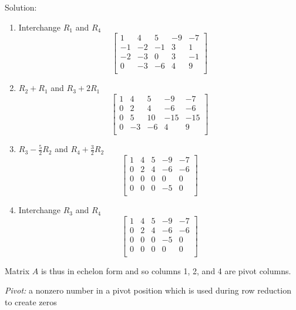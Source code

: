 \documentclass[12pt]{article} %
\begin{document}
Solution:
\begin{enumerate}
\item Interchange $R_1$ and $R_4$
	$$\begin{bmatrix}
		1 & 4 & 5 & -9 & -7\\
		-1 & -2 & -1 & 3 & 1\\
		-2 & -3 & 0 & 3 & -1\\
		0 & -3 & -6 & 4 & 9\\
	\end{bmatrix}$$

\item $R_2 + R_1$ and $R_3 + 2R_1$
	$$\begin{bmatrix}
		1 & 4 & 5 & -9 & -7\\
		0 & 2 & 4 & -6 & -6\\
		0 & 5 & 10 & -15 & -15\\
		0 & -3 & -6 & 4 & 9\\
	\end{bmatrix}$$

\item $R_3 -\frac{5}{2}R_2$ and $R_4 + \frac{3}{2}R_2$
	$$\begin{bmatrix}
		1 & 4 & 5 & -9 & -7\\
		0 & 2 & 4 & -6 & -6\\
		0 & 0 & 0 & 0 & 0\\
		0 & 0 & 0 & -5 & 0\\
	\end{bmatrix}$$

\item Interchange $R_3$ and $R_4$
	$$\begin{bmatrix}
		1 & 4 & 5 & -9 & -7\\
		0 & 2 & 4 & -6 & -6\\
		0 & 0 & 0 & -5 & 0\\
		0 & 0 & 0 & 0 & 0\\
	\end{bmatrix}$$
	
\end{enumerate}
Matrix $A$ is thus in echelon form and so columns 1, 2, and 4 are pivot columns.

\emph{Pivot:} a nonzero number in a pivot position which is used during row reduction to create zeros
\end{document}
